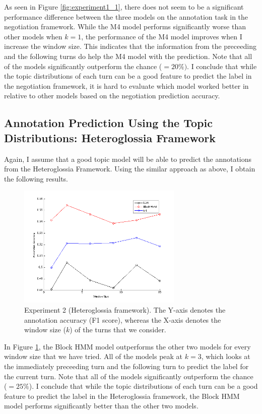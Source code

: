 \documentclass{article}
\begin{document}
As seen in Figure \ref{fig:experiment1_1}, there does not seem to be a significant performance difference between the three models on the annotation task in the negotiation framework. While the M4 model performs significantly worse than other models when $k = 1$, the performance of the M4 model improves when I increase the window size. This indicates that the information from the preceeding and the following turns do help the M4 model with the prediction. Note that all of the models significantly outperform the chance ($=20 \%)$. I conclude that while the topic distributions of each turn can be a good feature to predict the label in the negotiation framework, it is hard to evaluate which model worked better in relative to other models based on the negotiation prediction accuracy.


\subsection{Annotation Prediction Using the Topic Distributions: Heteroglossia Framework}

Again, I assume that a good topic model will be able to predict the annotations from the Heteroglossia Framework. Using the similar approach as above, I obtain the following results.

\begin{figure}[h!]
  \centering
    \includegraphics[width=0.7\textwidth]{experiment1_2.png}
    \caption{Experiment 2 (Heteroglossia framework). The Y-axis denotes the annotation accuracy (F1 score), whereas the X-axis denotes the window size ($k$) of the turns that we consider.}
  \label{fig:experiment1_2}
\end{figure}

In Figure \ref{fig:experiment1_2}, the Block HMM model outperforms the other two models for every window size that we have tried. All of the models peak at $k=3$, which looks at the immediately preceeding turn and the following turn to predict the label for the current turn. Note that all of the models significantly outperform the chance ($=25 \%$). I conclude that while the topic distributions of each turn can be a good feature to predict the label in the Heteroglossia framework, the Block HMM model performs significantly better than the other two models.
\end{document}
